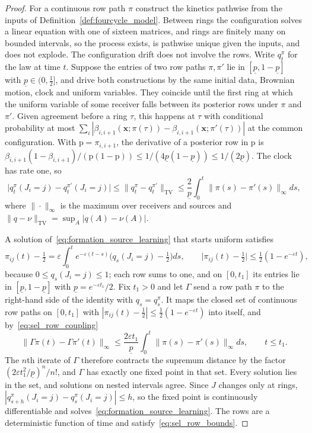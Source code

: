 \begin{proof}
For a continuous row path $\pi$ construct the kinetics pathwise from the inputs of Definition~\ref{def:fourcycle_model}. Between rings the configuration solves a linear equation with one of sixteen matrices, and rings are finitely many on bounded intervals, so the process exists, is pathwise unique given the inputs, and does not explode. The configuration drift does not involve the rows. Write $q^\pi_t$ for the law at time $t$. Suppose the entries of two row paths $\pi,\pi'$ lie in $[\underline p,1-\underline p]$ with $\underline p\in(0,\frac12]$, and drive both constructions by the same initial data, Brownian motion, clock and uniform variables. They coincide until the first ring at which the uniform variable of some receiver falls between its posterior rows under $\pi$ and $\pi'$. Given agreement before a ring $\tau$, this happens at $\tau$ with conditional probability at most $\sum_i|\beta_{i,i+1}(\mathbf x;\pi(\tau))-\beta_{i,i+1}(\mathbf x;\pi'(\tau))|$ at the common configuration. With $\mathrm p=\pi_{i,i+1}$, the derivative of a posterior row in $\mathrm p$ is $\beta_{i,i+1}(1-\beta_{i,i+1})/(\mathrm p(1-\mathrm p))\le1/(4\underline p(1-\underline p))\le1/(2\underline p)$. The clock has rate one, so
\begin{equation}
\bigl|q^\pi_t(J_i=j)-q^{\pi'}_t(J_i=j)\bigr|\le\|q^\pi_t-q^{\pi'}_t\|_{\mathrm{TV}}\le\frac2{\underline p}\int_0^t\|\pi(s)-\pi'(s)\|_\infty ds,
\label{eq:sel_row_coupling}
\end{equation}
where $\|\cdot\|_\infty$ is the maximum over receivers and sources and $\|q-\nu\|_{\mathrm{TV}}=\sup_A|q(A)-\nu(A)|$.

A solution of~\eqref{eq:formation_source_learning} that starts uniform satisfies
\[
\pi_{ij}(t)-\tfrac12=\varepsilon\int_0^te^{-\varepsilon(t-s)}\bigl(q_s(J_i=j)-\tfrac12\bigr)ds,
\qquad
\bigl|\pi_{ij}(t)-\tfrac12\bigr|\le\tfrac12(1-e^{-\varepsilon t}),
\]
because $0\le q_s(J_i=j)\le1$; each row sums to one, and on $[0,t_1]$ its entries lie in $[\underline p,1-\underline p]$ with $\underline p=e^{-\varepsilon t_1}/2$. Fix $t_1>0$ and let $\Gamma$ send a row path $\pi$ to the right-hand side of the identity with $q_s=q^\pi_s$. It maps the closed set of continuous row paths on $[0,t_1]$ with $|\pi_{ij}(t)-\frac12|\le\frac12(1-e^{-\varepsilon t})$ into itself, and by~\eqref{eq:sel_row_coupling}
\[
\|\Gamma\pi(t)-\Gamma\pi'(t)\|_\infty\le\frac{2\varepsilon t_1}{\underline p}\int_0^t\|\pi(s)-\pi'(s)\|_\infty ds,\qquad t\le t_1.
\]
The $n$th iterate of $\Gamma$ therefore contracts the supremum distance by the factor $(2\varepsilon t_1^2/\underline p)^n/n!$, and $\Gamma$ has exactly one fixed point in that set. Every solution lies in the set, and solutions on nested intervals agree. Since $J$ changes only at rings, $|q^\pi_{s+h}(J_i=j)-q^\pi_s(J_i=j)|\le h$, so the fixed point is continuously differentiable and solves~\eqref{eq:formation_source_learning}. The rows are a deterministic function of time and satisfy~\eqref{eq:sel_row_bounds}.
\end{proof}

